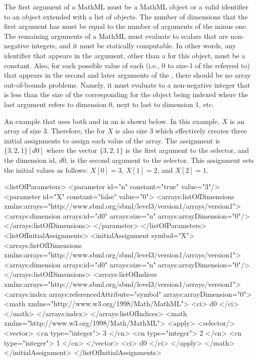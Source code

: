 The first argument of a MathML  must be a MathML
 object or a valid identifier to an \SBase object extended
with a list of \Dimension objects.   The number of dimensions that the
first argument has must be equal to the number of arguments of the
 minus one. The remaining arguments of a MathML
 must evaluate to scalars that are non-negative integers, and it must be statically computable.   In other words, any identifier that appears in the argument, other than a \Dimension {} for this object, must be a constant.   Also, for each possible value of each \Dimension {}  (i.e., 0 to size-1 of the \Dimension referred to) that appears in the second and later arguments of the , there should be no array out-of-bounds problems.
Namely, it must evaluate to a non-negative integer that is less than the size of the corresponding \Dimension for the object being indexed where the last argument refers to dimension 0, next to last to dimension 1, etc.

An example that uses both  and  in an \InitialAssignment is shown below.   In this example, $X$ is an array of size 3.  Therefore, the \InitialAssignment for $X$ is also size 3 which effectively creates three initial assignments to assign each value of the array.  The assignment is $\{ 3, 2, 1 \}[d0]$ where the vector $\{ 3, 2, 1 \}$ is the first argument to the selector, and the \InitialAssignment dimension id, $d0$, is the second argument to the selector.  This assignment sets the initial values as follows: $X[0]=3$, $X[1]=2$, and $X[2]=1$.
\begin{example}[showstringspaces=false]
<listOfParameters>
  <parameter id="n" constant="true" value="3"/>
  <parameter id="X" constant="false" value="0">
    <arrays:listOfDimensions xmlns:arrays="http://www.sbml.org/sbml/level3/version1/arrays/version1">
      <arrays:dimension arrays:id="d0" arrays:size="n" arrays:arrayDimension="0"/>
    </arrays:listOfDimensions>
  </parameter>
</listOfParameters>
<listOfInitialAssignments>
  <initialAssignment symbol="X">
    <arrays:listOfDimensions xmlns:arrays="http://www.sbml.org/sbml/level3/version1/arrays/version1">
      <arrays:dimension arrays:id="d0" arrays:size="n" arrays:arrayDimension="0"/>
    </arrays:listOfDimensions>
    <arrays:listOfIndices xmlns:arrays="http://www.sbml.org/sbml/level3/version1/arrays/version1">
      <arrays:index arrays:referencedAttribute="symbol" arrays:arrayDimension="0">
        <math xmlns="http://www.w3.org/1998/Math/MathML">
          <ci> d0 </ci>
        </math>
      </arrays:index>
    </arrays:listOfIndices>
    <math xmlns="http://www.w3.org/1998/Math/MathML">
      <apply>
        <selector/>
        <vector>
          <cn type="integer"> 3 </cn>
          <cn type="integer"> 2 </cn>
          <cn type="integer"> 1 </cn>
        </vector>
        <ci> d0 </ci>
      </apply>
    </math>
  </initialAssignment>
</listOfInitialAssignments>
\end{example}


